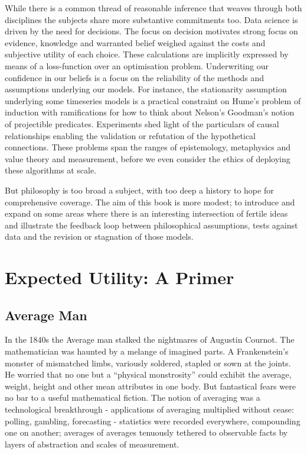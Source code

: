 \documentclass[]{tufte-book}
\theoremstyle{definition}
\theoremstyle{definition}
\theoremstyle{definition}
\theoremstyle{remark}
\begin{document}
While there is a common thread of reasonable inference that weaves through both disciplines the subjects share more substantive commitments too. Data science is driven by the need for decisions. The focus on decision motivates strong focus on evidence, knowledge and warranted belief weighed against the costs and subjective utility of each choice. These calculations are implicitly expressed by means of a loss-function over an optimisation problem. Underwriting our confidence in our beliefs is a focus on the reliability of the methods and assumptions underlying our models. For instance, the stationarity assumption underlying some timeseries models is a practical constraint on Hume's problem of induction with ramifications for how to think about Nelson's Goodman's notion of projectible predicates. Experiments shed light of the particulars of causal relationships enabling the validation or refutation of the hypothetical connections. These problems span the ranges of epistemology, metaphysics and value theory and measurement, before we even consider the ethics of deploying these algorithms at scale.

But philosophy is too broad a subject, with too deep a history to hope for comprehensive coverage. The aim of this book is more modest; to introduce and expand on some areas where there is an interesting intersection of fertile ideas and illustrate the feedback loop between philosophical assumptions, tests against data and the revision or stagnation of those models.

\hypertarget{expected-utility-a-primer}{%
\chapter{Expected Utility: A Primer}\label{expected-utility-a-primer}}

\hypertarget{average-man}{%
\section{Average Man}\label{average-man}}

In the 1840s the Average man stalked the nightmares of Augustin Cournot. The mathematician was haunted by a melange of imagined parts. A Frankenstein's monster of mismatched limbs, variously soldered, stapled or sown at the joints. He worried that no one but a ``physical monstrosity'' could exhibit the average, weight, height and other mean attributes in one body. \citep{stigler2016seven} But fantastical fears were no bar to a useful mathematical fiction. The notion of averaging was a technological breakthrough - applications of averaging multiplied without cease: polling, gambling, forecasting - statistics were recorded everywhere, compounding one on another; averages of averages tenuously tethered to observable facts by layers of abstraction and scales of measurement.
\end{document}
